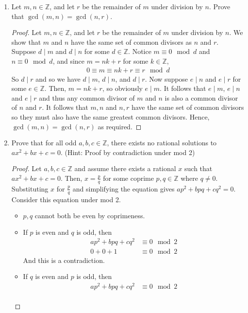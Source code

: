 \documentclass[letterpaper,12pt]{article}
\begin{document}
\begin{enumerate}
\begin{proof}
\end{proof}
\item Let $m,n \in \mathbb{Z}$, and let $r$ be the remainder of $m$ under division by $n$. Prove that $\gcd (m,n) = \gcd (n,r)$. \begin{proof}
     Let $m,n \in \mathbb{Z}$, and let $r$ be the remainder of $m$ under division by $n$. We show that $m$ and $n$ have the same set of common divisors as $n$ and $r$. Suppose $d \mid m$ and $d \mid n$ for some $d \in \mathbb{Z}$. Notice $m \equiv 0 \mod d$ and $n \equiv 0 \mod d$, and since $m = nk + r$ for some $k \in \mathbb{Z}$, \begin{align*}
         0 \equiv m \equiv nk+ r \equiv r \mod d
     \end{align*}
So $d \mid r$ and so we have $d \mid m$, $d \mid n$, and $d \mid r$. Now suppose $e \mid n$ and $e \mid r$ for some $e \in \mathbb{Z}$. Then, $m = nk + r$, so obviously $e\mid m$. It follows that $e \mid m$, $e \mid n$ and $e \mid r$ and thus any common divisor of $m$ and $n$ is also a common divisor of $n$ and $r$. It follows that $m,n$ and $n,r$ have the same set of common divisors so they must also have the same greatest common divisors. Hence, $\gcd(m,n) = \gcd(n,r)$ as required.
\end{proof}
    \item Prove that for all odd $a,b,c \in \mathbb{Z}$, there exists no rational solutions to $ax^2 + bx + c = 0$. (Hint: Proof by contradiction under mod 2) \begin{proof}
    Let $a,b,c \in \mathbb{Z}$ and assume there exists a rational $x$ such that $ax^2 + bx + c = 0$. Then, $x = \frac{p}{q}$ for some coprime $p,q \in \mathbb{Z}$ where $q \neq 0$. Substituting $x$ for $\frac{p}{q}$ and simplifying the equation gives $ap^2 + bpq + cq^2 = 0$. Consider this equation under mod 2. \begin{itemize}
        \item $p,q$ cannot both be even by coprimeness.
        \item If $p$ is even and $q$ is odd, then \begin{align*}
            ap^2 + bpq + cq^2 &\equiv 0 \mod 2 \\
            0 + 0 + 1 &\equiv 0 \mod 2
        \end{align*}
        And this is a contradiction.
        \item If $q$ is even and $p$ is odd, then \begin{align*}
            ap^2 + bpq + cq^2 &\equiv 0 \mod 2 \\

\end{align*}
\end{itemize}
\end{proof}
\end{enumerate}
\end{document}
